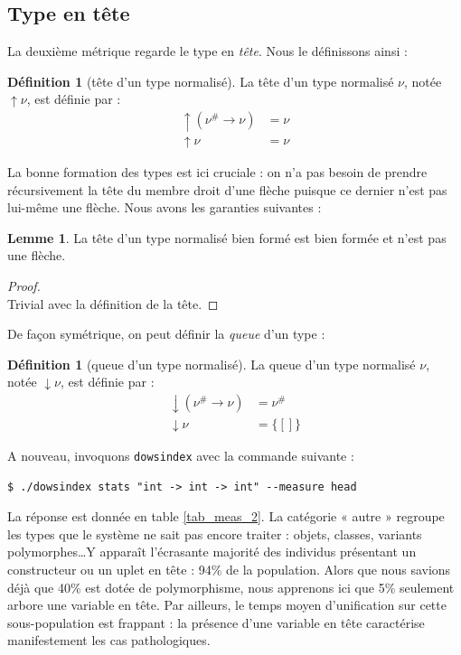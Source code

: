 \documentclass[a4paper]{report}
\newenvironment{preuve} 
	{\begin{proof}~\\} 
	{\end{proof}}
\theoremstyle{definition}
\newtheorem{definition}[theoreme]{Définition}
\newtheorem{lemme}[theoreme]{Lemme}
\newcommand{\dowsindex}{\texttt{dowsindex}\xspace}
\newcommand{\mset}[1]{\{\![#1]\!\}}
\begin{document}

\subsection{Type en tête}

La deuxième métrique regarde le type en \emph{tête}. Nous le définissons ainsi :

\begin{definition}[tête d'un type normalisé]
	La tête d'un type normalisé $\nu$, notée $\uparrow \nu$, est définie par :
	\begin{align*}
			\uparrow (\nu^\# \rightarrow \nu) &=
			\nu
		\\
			\uparrow \nu &=
			\nu
	\end{align*}
\end{definition}

La bonne formation des types est ici cruciale : on n'a pas besoin de prendre récursivement la tête du membre droit d'une flèche puisque ce dernier n'est pas lui-même une flèche. Nous avons les garanties suivantes :

\begin{lemme} \label{bf_implique_tete_bf_et_non_fleche}
	La tête d'un type normalisé bien formé est bien formée et n'est pas une flèche.
\end{lemme}

\begin{preuve}
	Trivial avec la définition de la tête.
\end{preuve}

De façon symétrique, on peut définir la \emph{queue} d'un type :

\begin{definition}[queue d'un type normalisé]
	La queue d'un type normalisé $\nu$, notée $\downarrow \nu$, est définie par :
	\begin{align*}
			\downarrow (\nu^\# \rightarrow \nu) &=
			\nu^\#
		\\
			\downarrow \nu &=
			\mset{}
	\end{align*}
\end{definition}

A nouveau, invoquons \dowsindex avec la commande suivante :

\begin{verbatim}
$ ./dowsindex stats "int -> int -> int" --measure head
\end{verbatim}

La réponse est donnée en table \ref{tab_meas_2}. La catégorie « autre » regroupe les types que le système ne sait pas encore traiter : objets, classes, variants polymorphes\dots Y apparaît l'écrasante majorité des individus présentant un constructeur ou un uplet en tête : 94\% de la population. Alors que nous savions déjà que 40\% est dotée de polymorphisme, nous apprenons ici que 5\% seulement arbore une variable en tête. Par ailleurs, le temps moyen d'unification sur cette sous-population est frappant : la présence d'une variable en tête caractérise manifestement les cas pathologiques.
\end{document}
